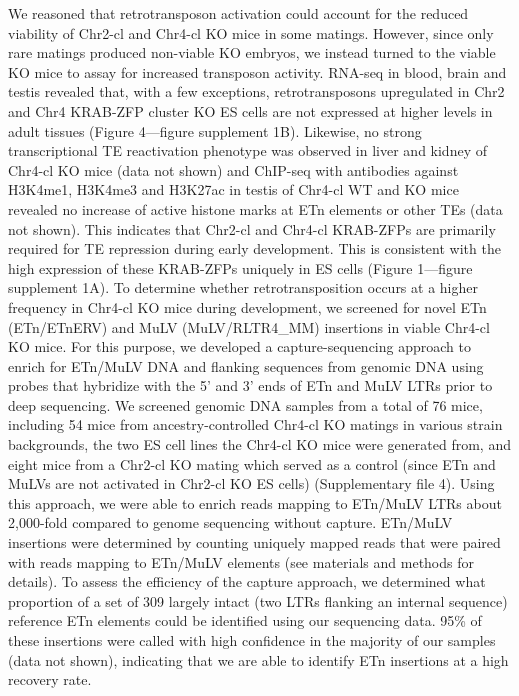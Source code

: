 \documentclass[11pt,a4paper]{article}
\begin{document}
We reasoned that retrotransposon activation could account for the reduced viability of Chr2-cl and Chr4-cl KO mice in some matings. However, since only rare matings produced non-viable KO embryos, we instead turned to the viable KO mice to assay for increased transposon activity. RNA-seq in blood, brain and testis revealed that, with a few exceptions, retrotransposons upregulated in Chr2 and Chr4 KRAB-ZFP cluster KO ES cells are not expressed at higher levels in adult tissues (Figure 4—figure supplement 1B). Likewise, no strong transcriptional TE reactivation phenotype was observed in liver and kidney of Chr4-cl KO mice (data not shown) and ChIP-seq with antibodies against H3K4me1, H3K4me3 and H3K27ac in testis of Chr4-cl WT and KO mice revealed no increase of active histone marks at ETn elements or other TEs (data not shown). This indicates that Chr2-cl and Chr4-cl KRAB-ZFPs are primarily required for TE repression during early development. This is consistent with the high expression of these KRAB-ZFPs uniquely in ES cells (Figure 1—figure supplement 1A). To determine whether retrotransposition occurs at a higher frequency in Chr4-cl KO mice during development, we screened for novel ETn (ETn/ETnERV) and MuLV (MuLV/RLTR4\_MM) insertions in viable Chr4-cl KO mice. For this purpose, we developed a capture-sequencing approach to enrich for ETn/MuLV DNA and flanking sequences from genomic DNA using probes that hybridize with the 5’ and 3’ ends of ETn and MuLV LTRs prior to deep sequencing. We screened genomic DNA samples from a total of 76 mice, including 54 mice from ancestry-controlled Chr4-cl KO matings in various strain backgrounds, the two ES cell lines the Chr4-cl KO mice were generated from, and eight mice from a Chr2-cl KO mating which served as a control (since ETn and MuLVs are not activated in Chr2-cl KO ES cells) (Supplementary file 4). Using this approach, we were able to enrich reads mapping to ETn/MuLV LTRs about 2,000-fold compared to genome sequencing without capture. ETn/MuLV insertions were determined by counting uniquely mapped reads that were paired with reads mapping to ETn/MuLV elements (see materials and methods for details). To assess the efficiency of the capture approach, we determined what proportion of a set of 309 largely intact (two LTRs flanking an internal sequence) reference ETn elements could be identified using our sequencing data. 95\% of these insertions were called with high confidence in the majority of our samples (data not shown), indicating that we are able to identify ETn insertions at a high recovery rate.
\end{document}

